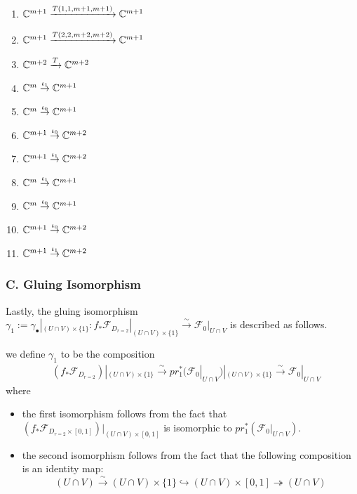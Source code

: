 \begin{enumerate}[label = (\arabic*)]
\item $\mathbb{C}^{m+1} \xrightarrow{T(1,1,m+1,m+1)} \mathbb{C}^{m+1}$

\item $\mathbb{C}^{m+1} \xrightarrow{T(2,2,m+2,m+2)} \mathbb{C}^{m+1}$

\item $\mathbb{C}^{m+2} \xrightarrow{T} \mathbb{C}^{m+2}$

\item $\mathbb{C}^{m} \overset{\iota_1}{\rightarrow} \mathbb{C}^{m+1}$

\item $\mathbb{C}^{m} \overset{\iota_0}{\rightarrow} \mathbb{C}^{m+1}$

\item $\mathbb{C}^{m+1} \overset{\iota_0}{\rightarrow} \mathbb{C}^{m+2}$

\item $\mathbb{C}^{m+1} \overset{\iota_1}{\rightarrow} \mathbb{C}^{m+2}$

\item $\mathbb{C}^{m} \overset{\iota_1}{\rightarrow} \mathbb{C}^{m+1}$

\item $\mathbb{C}^{m} \overset{\iota_0}{\rightarrow} \mathbb{C}^{m+1}$

\item $\mathbb{C}^{m+1} \overset{\iota_0}{\rightarrow} \mathbb{C}^{m+2}$

\item $\mathbb{C}^{m+1} \overset{\iota_1}{\rightarrow} \mathbb{C}^{m+2}$
\end{enumerate}

\subsubsection{C. Gluing Isomorphism}
Lastly, the gluing isomorphism $\gamma_1 := \gamma_\bullet|_{(U\cap V)\times \{1\}}:  f_*\mathscr{F}_{D_{r=2}}|_{(U\cap V)\times \{1\}}\xrightarrow{\sim} \mathscr{F}_0|_{U\cap V}$ is described as follows.

\begin{definition}
we define $\gamma_1$ to be the composition
\begin{align*}
&(f_*\mathscr{F}_{D_{r=2}})|_{(U\cap V)\times \{1\}}\xrightarrow{\sim}pr_1^*(\mathscr{F}_0|_{U\cap V})|_{(U\cap V)\times \{1\}}\xrightarrow{\sim}\mathscr{F}_0|_{U\cap V}
\end{align*}
where
\begin{itemize}
\item the first isomorphism follows from the fact that $(f_*\mathscr{F}_{D_{r=2}\times [0,1]})|_{(U\cap V)\times[0,1]}$ is isomorphic to $pr_1^*(\mathscr{F}_0|_{U\cap V})$.

\item the second isomorphism follows from the fact that the following composition is an identity map:
\[
(U\cap V)\xrightarrow{\sim} (U\cap V)\times \{1\} \hookrightarrow (U\cap V)\times [0,1] \twoheadrightarrow (U\cap V)
\]
\end{itemize}
\end{definition}